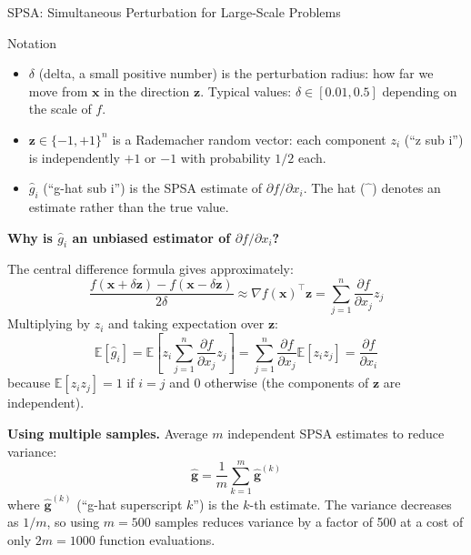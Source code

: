 \documentclass[aspectratio=169,10pt]{beamer}
\newcommand{\x}{\mathbf{x}}
\begin{document}
\begin{frame}[allowframebreaks]{SPSA: Simultaneous Perturbation for Large-Scale Problems}
  \begin{block}{Notation}
    \begin{itemize}
      \item $\delta$ (delta, a small positive number) is the perturbation
            radius: how far we move from $\x$ in the direction $\mathbf{z}$.
            Typical values: $\delta \in [0.01, 0.5]$ depending on the scale
            of $f$.
      \item $\mathbf{z} \in \{-1,+1\}^n$ is a Rademacher random vector:
            each component $z_i$ (``z sub i'') is independently $+1$ or $-1$
            with probability $1/2$ each.
      \item $\hat{g}_i$ (``g-hat sub i'') is the SPSA estimate of
            $\partial f / \partial x_i$.  The hat ($\hat{\phantom{x}}$)
            denotes an estimate rather than the true value.
    \end{itemize}
  \end{block}

  \framebreak

  \textbf{Why is $\hat{g}_i$ an unbiased estimator of $\partial f/\partial x_i$?}

  The central difference formula gives approximately:
  \[
    \frac{f(\x+\delta\mathbf{z}) - f(\x-\delta\mathbf{z})}{2\delta}
    \approx \nabla f(\x)^\top \mathbf{z}
    = \sum_{j=1}^{n} \frac{\partial f}{\partial x_j} z_j
  \]
  Multiplying by $z_i$ and taking expectation over $\mathbf{z}$:
  \[
    \mathbb{E}[\hat{g}_i]
    = \mathbb{E}\!\left[z_i \sum_{j=1}^n \frac{\partial f}{\partial x_j} z_j\right]
    = \sum_{j=1}^n \frac{\partial f}{\partial x_j} \mathbb{E}[z_i z_j]
    = \frac{\partial f}{\partial x_i}
  \]
  because $\mathbb{E}[z_i z_j] = 1$ if $i=j$ and $0$ otherwise
  (the components of $\mathbf{z}$ are independent).

  \medskip
  \textbf{Using multiple samples.}
  Average $m$ independent SPSA estimates to reduce variance:
  \[
    \hat{\mathbf{g}}
    = \frac{1}{m} \sum_{k=1}^{m} \hat{\mathbf{g}}^{(k)}
  \]
  where $\hat{\mathbf{g}}^{(k)}$ (``g-hat superscript $k$'') is the
  $k$-th estimate.  The variance decreases as $1/m$, so using $m=500$
  samples reduces variance by a factor of 500 at a cost of only $2m=1000$
  function evaluations.

\end{frame}
\end{document}
